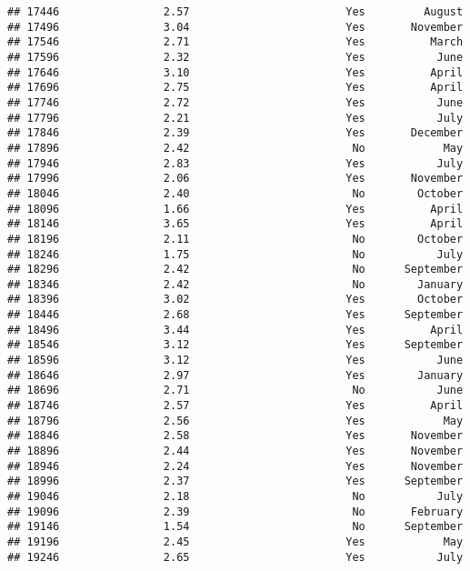 \documentclass[
]{article}
\begin{document}
\begin{verbatim}
## 17446                2.57                        Yes         August
## 17496                3.04                        Yes       November
## 17546                2.71                        Yes          March
## 17596                2.32                        Yes           June
## 17646                3.10                        Yes          April
## 17696                2.75                        Yes          April
## 17746                2.72                        Yes           June
## 17796                2.21                        Yes           July
## 17846                2.39                        Yes       December
## 17896                2.42                         No            May
## 17946                2.83                        Yes           July
## 17996                2.06                        Yes       November
## 18046                2.40                         No        October
## 18096                1.66                        Yes          April
## 18146                3.65                        Yes          April
## 18196                2.11                         No        October
## 18246                1.75                         No           July
## 18296                2.42                         No      September
## 18346                2.42                         No        January
## 18396                3.02                        Yes        October
## 18446                2.68                        Yes      September
## 18496                3.44                        Yes          April
## 18546                3.12                        Yes      September
## 18596                3.12                        Yes           June
## 18646                2.97                        Yes        January
## 18696                2.71                         No           June
## 18746                2.57                        Yes          April
## 18796                2.56                        Yes            May
## 18846                2.58                        Yes       November
## 18896                2.44                        Yes       November
## 18946                2.24                        Yes       November
## 18996                2.37                        Yes      September
## 19046                2.18                         No           July
## 19096                2.39                         No       February
## 19146                1.54                         No      September
## 19196                2.45                        Yes            May
## 19246                2.65                        Yes           July

\end{verbatim}
\end{document}

